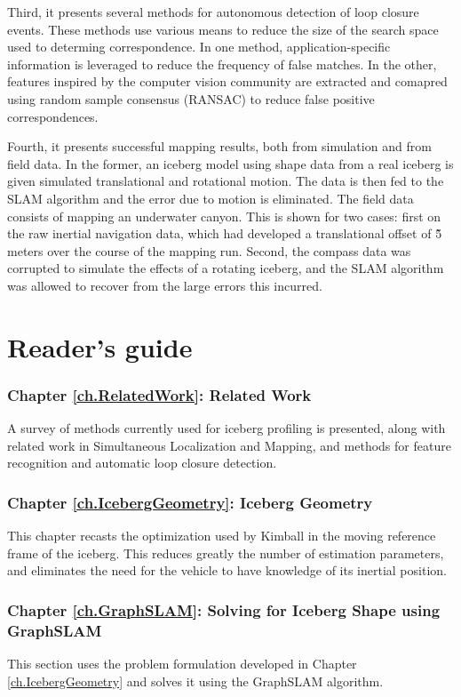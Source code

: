 Third, it presents several methods for autonomous detection of loop closure events. These methods use various means to reduce the size of the search space used to determing correspondence. In one method, application-specific information is leveraged to reduce the frequency of false matches. In the other, features inspired by the computer vision community are extracted and comapred using random sample consensus (RANSAC) to reduce  false positive correspondences.

Fourth, it presents successful mapping results, both from simulation and from field data. In the former, an iceberg model using shape data from a real iceberg is given simulated translational and rotational motion. The data is then fed to the SLAM algorithm and the error due to motion is eliminated. The field data consists of mapping an underwater canyon. This is shown for two cases: first on the raw inertial navigation data, which had developed a translational offset of \~5 meters over the course of the mapping run. Second, the compass data was corrupted to simulate the effects of a rotating iceberg, and the SLAM algorithm was allowed to recover from the large errors this incurred.

\section{Reader's guide}

\subsubsection*{Chapter \ref{ch.RelatedWork}: Related Work} A survey of methods currently used for iceberg profiling is presented, along with related work in Simultaneous Localization and Mapping, and methods for feature recognition and automatic loop closure detection.

\subsubsection*{Chapter \ref{ch.IcebergGeometry}: Iceberg Geometry}  This chapter recasts the optimization used by Kimball \cite{} in the moving reference frame of the iceberg. This reduces greatly the number of estimation parameters, and eliminates the need for the vehicle to have knowledge of its inertial position.

\subsubsection*{Chapter \ref{ch.GraphSLAM}: Solving for Iceberg Shape using GraphSLAM} This section uses the problem formulation developed in Chapter \ref{ch.IcebergGeometry} and solves it using the GraphSLAM algorithm.

